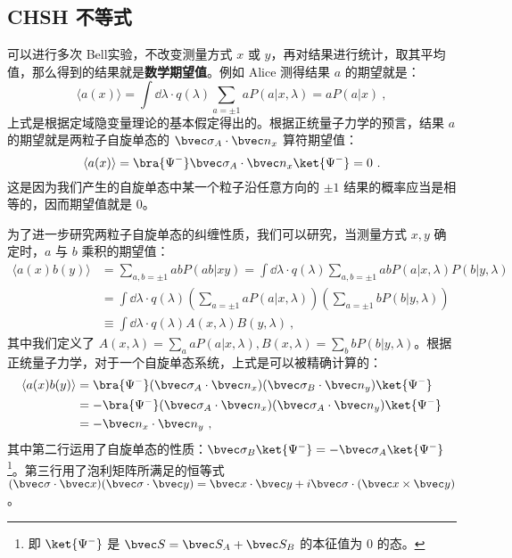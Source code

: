 \subsection{CHSH 不等式}
可以进行多次 Bell实验，不改变测量方式 $x$ 或 $y$，再对结果进行统计，取其平均值，那么得到的结果就是\textbf{数学期望值}。例如 Alice 测得结果 $a$ 的期望就是：
\begin{equation}
\langle a(x) \rangle =\int \dd \lambda \cdot q(\lambda) \sum_{a=\pm 1}a P(a|x,\lambda) = a P(a|x)~,
\end{equation}
上式是根据定域隐变量理论的基本假定得出的。根据正统量子力学的预言，结果 $a$ 的期望就是两粒子自旋单态的 $\bvec \sigma_A\cdot \bvec n_x$ 算符期望值：
\begin{equation}
\langle a(x)\rangle = \bra{\Psi^-} \bvec \sigma_A \cdot \bvec n_x \ket{\Psi^-} = 0~.
\end{equation}
这是因为我们产生的自旋单态中某一个粒子沿任意方向的 $\pm 1$ 结果的概率应当是相等的，因而期望值就是 $0$。

为了进一步研究两粒子自旋单态的纠缠性质，我们可以研究，当测量方式 $x,y$ 确定时，$a$ 与 $b$ 乘积的期望值：
\begin{equation}\label{eq_chsh_1}
\begin{aligned}
\langle a(x)b(y)\rangle &= \sum_{a,b=\pm 1} ab P(ab|xy)=\int \dd\lambda \cdot q(\lambda) \sum_{a,b=\pm 1}abP(a|x,\lambda)P(b|y,\lambda)\\
&=\int \dd\lambda \cdot q(\lambda) \left(\sum_{a=\pm 1}aP(a|x,\lambda)\right)\left(\sum_{a=\pm 1}bP(b|y,\lambda)\right)\\
&\equiv \int \dd\lambda\cdot q(\lambda) A(x,\lambda) B(y,\lambda)~,
\end{aligned}
\end{equation}
其中我们定义了 $A(x,\lambda)=\sum_a aP(a|x,\lambda),B(x,\lambda)=\sum_b bP(b|y,\lambda)$。根据正统量子力学，对于一个自旋单态系统，上式是可以被精确计算的：
\begin{equation}
\begin{aligned}
\langle a(x)b(y)\rangle &= \bra{\Psi^-} (\bvec \sigma_A\cdot \bvec n_x)(\bvec \sigma_B\cdot \bvec n_y)\ket{\Psi^-}\\
&=-\bra{\Psi^-} (\bvec \sigma_A\cdot \bvec n_x)(\bvec \sigma_A\cdot \bvec n_y)\ket{\Psi^-}\\
&=-\bvec n_x\cdot \bvec n_y~,
\end{aligned}
\end{equation}
其中第二行运用了自旋单态的性质：$\bvec \sigma_B\ket{\Psi^-}=-\bvec \sigma_A\ket{\Psi^-}$ \footnote{即 $\ket{\Psi^-}$  是 $\bvec S=\bvec S_A+\bvec S_B$ 的本征值为 $0$ 的态。}。第三行用了泡利矩阵所满足的恒等式 $(\bvec \sigma \cdot \bvec x)(\bvec \sigma\cdot \bvec y)=\bvec x\cdot \bvec y+i\bvec \sigma\cdot (\bvec x\times \bvec y)$。

